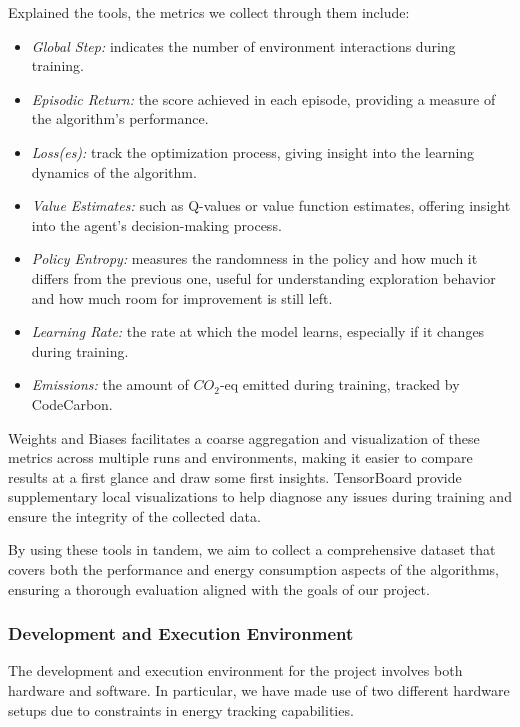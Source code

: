 Explained the tools, the metrics we collect through them include:
\begin{itemize}
	\item \textit{Global Step:} indicates the number of environment interactions during training.
	\item \textit{Episodic Return:} the score achieved in each episode, providing a measure of the algorithm's performance.
	\item \textit{Loss(es):} track the optimization process, giving insight into the learning dynamics of the algorithm.
	\item \textit{Value Estimates:} such as Q-values or value function estimates, offering insight into the agent's decision-making process.
	\item \textit{Policy Entropy:} measures the randomness in the policy and how much it differs from the previous one, useful for understanding exploration behavior and how much room for improvement is still left.
	\item \textit{Learning Rate:} the rate at which the model learns, especially if it changes during training.
	\item \textit{Emissions:} the amount of $CO_2$-eq emitted during training, tracked by CodeCarbon.
\end{itemize}

Weights and Biases facilitates a coarse aggregation and visualization of these metrics across multiple runs and environments, making it easier to compare results at a first glance and draw some first insights. TensorBoard provide supplementary local visualizations to help diagnose any issues during training and ensure the integrity of the collected data.

By using these tools in tandem, we aim to collect a comprehensive dataset that covers both the performance and energy consumption aspects of the algorithms, ensuring a thorough evaluation aligned with the goals of our project.

\subsubsection{Development and Execution Environment}
\label{subsubsec:development_execution_environment}

The development and execution environment for the project involves both hardware and software. In particular, we have made use of two different hardware setups due to constraints in energy tracking capabilities.

